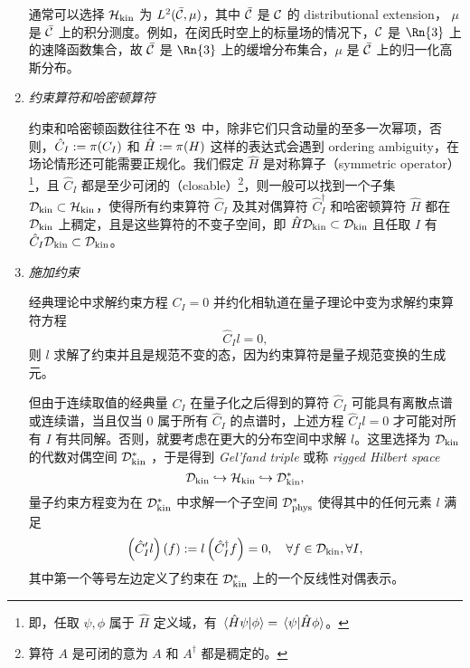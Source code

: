\begin{enumerate}
					通常可以选择 $\mathcal{H}_{\text{kin}}$ 为 $L^2(\bar{\mathcal{C}},\mu)$，其中 $\bar{\mathcal{C}}$ 是 $\mathcal{C}$ 的 distributional extension， $\mu$ 是 $\bar{\mathcal{C}}$ 上的积分测度。例如，在闵氏时空上的标量场的情况下，$\mathcal{C}$ 是 $\Rn{3}$ 上的速降函数集合，故 $\bar{\mathcal{C}}$ 是 $\Rn{3}$ 上的缓增分布集合，$\mu$ 是 $\bar{\mathcal{C}}$ 上的归一化高斯分布。

			\item \emph{约束算符和哈密顿算符}
			
					约束和哈密顿函数往往不在 $\mathfrak{B}$ 中，除非它们只含动量的至多一次幂项，否则，$\hat{C}_I := \pi(C_I)$ 和 $\hat{H} := \pi(H)$ 这样的表达式会遇到 ordering ambiguity，在场论情形还可能需要正规化。我们假定 $\hat{H}$ 是对称算子（symmetric operator）\footnote{即，任取 $\psi,\phi$ 属于 $\hat{H}$ 定义域，有 $\ip*{\hat{H}\psi}{\phi} = \ip*{\psi}{\hat{H} \phi}$。}，且 $\hat{C}_I$ 都是至少可闭的（closable）\footnote{算符 $A$ 是可闭的意为 $A$ 和 $A^\dagger$ 都是稠定的。}，则一般可以找到一个子集 $\mathcal{D}_{\text{kin}} \subset \mathcal{H}_{\text{kin}}$，使得所有约束算符 $\hat{C}_I$ 及其对偶算符 $\hat{C}_I^\dagger$ 和哈密顿算符 $\hat{H}$ 都在 $\mathcal{D}_{\text{kin}}$ 上稠定，且是这些算符的不变子空间，即 $\hat{H} \mathcal{D}_{\text{kin}} \subset \mathcal{D}_{\text{kin}}$ 且任取 $I$ 有 $\hat{C}_I \mathcal{D}_{\text{kin}} \subset \mathcal{D}_{\text{kin}}$。

			\item \emph{施加约束}
			
					经典理论中求解约束方程 $C_I=0$ 并约化相轨道在量子理论中变为求解约束算符方程 
					\begin{equation}
						\hat{C}_I l =0,
					\end{equation}
					则 $l$ 求解了约束并且是规范不变的态，因为约束算符是量子规范变换的生成元。

					但由于连续取值的经典量 $C_I$ 在量子化之后得到的算符 $\hat{C}_I$ 可能具有离散点谱或连续谱，当且仅当 $0$ 属于所有 $\hat{C}_I$ 的点谱时，上述方程 $\hat{C}_I l =0$ 才可能对所有 $I$ 有共同解。否则，就要考虑在更大的分布空间中求解 $l$。这里选择为 $\mathcal{D}_{\text{kin}}$ 的代数对偶空间 $\mathcal{D}_{\text{kin}}^*$ ，于是得到 \emph{Gel'fand triple} 或称 \emph{rigged Hilbert space}
					\begin{equation}
						\mathcal{D}_{\text{kin}} \hookrightarrow \mathcal{H}_{\text{kin}} \hookrightarrow \mathcal{D}_{\text{kin}}^*,
					\end{equation}
					量子约束方程变为在 $\mathcal{D}_{\text{kin}}^*$ 中求解一个子空间 $\mathcal{D}_{\text{phys}}^*$ 使得其中的任何元素 $l$ 满足
					\begin{equation}
						\left( \hat{C}_I^\prime l \right)(f) \definedby l \left( \hat{C}_I^\dagger f \right) = 0 \qc \forall f \in \Dkin, \forall I,
					\end{equation}
					其中第一个等号左边定义了约束在 $\mathcal{D}_{\text{kin}}^*$ 上的一个反线性对偶表示。


\end{enumerate}
